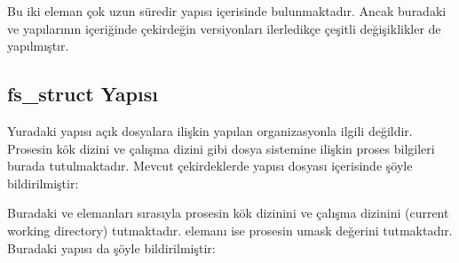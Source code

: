 \documentclass[a4paper,10pt,turkish]{sphinxmanual}
\begin{document}
\sphinxAtStartPar
Bu iki eleman çok uzun süredir  yapısı içerisinde bulunmaktadır. Ancak buradaki
 ve  yapılarının içeriğinde çekirdeğin versiyonları ilerledikçe
çeşitli değişiklikler de yapılmıştır.


\subsection{fs\_struct Yapısı}
\label{\detokenize{filesystem1:fs-struct-yapisi}}
\sphinxAtStartPar
Yuradaki  yapısı açık dosyalara ilişkin yapılan organizasyonla ilgili değildir.
Prosesin kök dizini ve çalışma dizini gibi dosya sistemine ilişkin proses bilgileri burada
tutulmaktadır. Mevcut çekirdeklerde  yapısı  dosyası
içerisinde şöyle bildirilmiştir:

\begin{sphinxVerbatim}[commandchars=\\\{\}]
\end{sphinxVerbatim}

\sphinxAtStartPar
Buradaki  ve  elemanları sırasıyla prosesin kök dizinini ve çalışma dizinini
(current working directory) tutmaktadır.  elemanı ise prosesin umask değerini
tutmaktadır. Buradaki  yapısı da şöyle bildirilmiştir:

\begin{sphinxVerbatim}[commandchars=\\\{\}]
\end{sphinxVerbatim}
\end{document}
